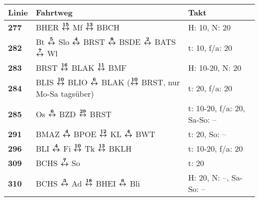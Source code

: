 \ifnacht
\begin{minipage}[t]{0.05\textwidth}
\phantom{Tor}
\end{minipage}
\begin{minipage}[t]{0.45\textwidth}
\begin{tabular}{>{\bfseries}L{1.2cm}L{9.0cm}L{3.0cm}}
{\bfseries Linie} & {\bfseries Fahrtweg} & {\bfseries Takt} \\
\hline
\bus{} 277    & BHER $\boldsymbol{\overset{15}{\leftrightarrow}}$ Mf $\boldsymbol{\overset{13}{\leftrightarrow}}$ BBCH                                                                                                                              & H: 10, N: 20               \\
\bus{} 282    & Bt $\boldsymbol{\overset{5}{\leftrightarrow}}$ Slo $\boldsymbol{\overset{4}{\leftrightarrow}}$ BRST $\boldsymbol{\overset{8}{\leftrightarrow}}$ BSDE $\boldsymbol{\overset{2}{\leftrightarrow}}$ BATS $\boldsymbol{\overset{7}{\leftrightarrow}}$ Wl                                                                                & t: 10, f/a: 20             \\
\bus{} 283    & BRST $\boldsymbol{\overset{16}{\leftrightarrow}}$ BLAK $\boldsymbol{\overset{11}{\leftrightarrow}}$ BMF                                                                                                                             & H: 10-20, N: 20            \\
\bus{} 284    & BLIS $\boldsymbol{\overset{10}{\leftrightarrow}}$ BLIO $\boldsymbol{\overset{6}{\leftrightarrow}}$ BLAK ($\boldsymbol{\overset{10}{\leftrightarrow}}$ BRST, nur Mo-Sa tagsüber)                                                                                     & t: 20, f/a: 20             \\
\bus{} 285    & Os $\boldsymbol{\overset{6}{\leftrightarrow}}$ BZD $\boldsymbol{\overset{29}{\leftrightarrow}}$ BRST                                                                                                                                & t: 10-20, f/a: 20, Sa-So: -- \\
\bus{} 291    & BMAZ $\boldsymbol{\overset{4}{\leftrightarrow}}$ BPOE $\boldsymbol{\overset{12}{\leftrightarrow}}$ KL $\boldsymbol{\overset{4}{\leftrightarrow}}$ BWT                                                                                                               & t: 20, So: --              \\
\bus{} 296    & BLI $\boldsymbol{\overset{4}{\leftrightarrow}}$ Fi $\boldsymbol{\overset{10}{\leftrightarrow}}$ Tk $\boldsymbol{\overset{13}{\leftrightarrow}}$ BKLH                                                                                                                & t: 10-20, f/a: 20          \\
\bus{} 309    & BCHS $\boldsymbol{\overset{7}{\leftrightarrow}}$ So                                                                                                                                                 & t: 20                      \\
\bus{} 310    & BCHS $\boldsymbol{\overset{3}{\leftrightarrow}}$ Ad $\boldsymbol{\overset{18}{\leftrightarrow}}$ BHEI $\boldsymbol{\overset{6}{\leftrightarrow}}$ Bli                                                                                                               & H: 20, N: --, Sa-So: --    \\

\end{tabular}
\end{minipage}
